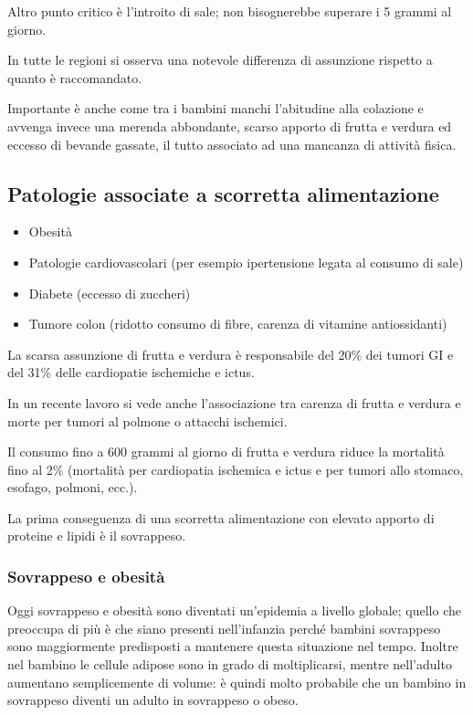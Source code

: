 Altro punto critico è l'introito di sale; non bisognerebbe superare i 5
grammi al giorno.

In tutte le regioni si osserva una notevole differenza di assunzione
rispetto a quanto è raccomandato.

Importante è anche come tra i bambini manchi l'abitudine alla colazione
e avvenga invece una merenda abbondante, scarso apporto di frutta e
verdura ed eccesso di bevande gassate, il tutto associato ad una
mancanza di attività fisica.

\subsection{Patologie associate a scorretta alimentazione}

\begin{itemize}
\item
  Obesità
\item
  Patologie cardiovascolari (per esempio ipertensione legata al consumo
  di sale)
\item
  Diabete (eccesso di zuccheri)
\item
  Tumore colon (ridotto consumo di fibre, carenza di vitamine
  antiossidanti)
\end{itemize}

La scarsa assunzione di frutta e verdura è responsabile del 20\% dei
tumori GI e del 31\% delle cardiopatie ischemiche e ictus.

In un recente lavoro si vede anche l'associazione tra carenza di frutta
e verdura e morte per tumori al polmone o attacchi ischemici.

Il consumo fino a 600 grammi al giorno di frutta e verdura riduce la
mortalità fino al 2\% (mortalità per cardiopatia ischemica e ictus e per
tumori allo stomaco, esofago, polmoni, ecc.).

La prima conseguenza di una scorretta alimentazione con elevato apporto
di proteine e lipidi è il sovrappeso.

\subsubsection{Sovrappeso e obesità}

Oggi sovrappeso e obesità sono diventati un'epidemia a livello globale;
quello che preoccupa di più è che siano presenti nell'infanzia perché
bambini sovrappeso sono maggiormente predisposti a mantenere questa
situazione nel tempo. Inoltre nel bambino le cellule adipose sono in
grado di moltiplicarsi, mentre nell'adulto aumentano semplicemente di
volume: è quindi molto probabile che un bambino in sovrappeso diventi un
adulto in sovrappeso o obeso.

